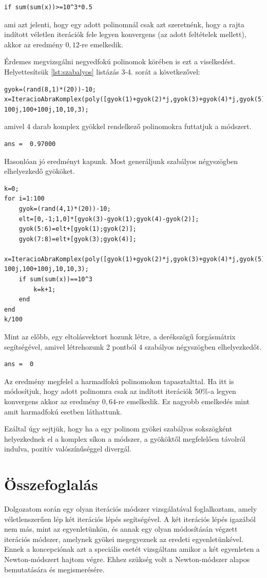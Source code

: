 \documentclass[a4paper,12pt]{report}
\newcommand{\todoor}[1]{\todo[color=orange!90, size=\footnotesize]{#1}}
\begin{document}
\begin{lstlisting}[firstnumber=6]
if sum(sum(x))>=10^3*0.5
\end{lstlisting}
ami azt jelenti, hogy egy adott polinomnál csak azt szeretnénk, hogy a rajta indított véletlen iterációk fele legyen konvergens (az adott feltételek mellett), akkor az eredmény $0,\!12$-re emelkedik.

Érdemes megvizsgálni negyedfokú polinomok körében is ezt a viselkedést. Helyettesítsük \ref{lst:szabalyos} listázás 3-4. sorát a következővel:
\begin{lstlisting}[firstnumber=3]
gyok=(rand(8,1)*(20))-10;
x=IteracioAbraKomplex(poly([gyok(1)+gyok(2)*j,gyok(3)+gyok(4)*j,gyok(5)+gyok(6)*j,gyok(7)+gyok(8)*j]),-100-100j,100+100j,10,10,3);
\end{lstlisting}
amivel 4 darab komplex gyökkel rendelkező polinomokra futtatjuk a módszert.
                \begin{lstlisting}[caption=Eredm\'eny]
ans =  0.97000
                \end{lstlisting}
Hasonlóan jó eredményt kapunk. Most generáljunk szabályos négyszögben elhelyezkedő gyököket.
\begin{lstlisting}[caption=Bemenet]
k=0;
for i=1:100
    gyok=(rand(4,1)*(20))-10;
    elt=[0,-1;1,0]*[gyok(3)-gyok(1);gyok(4)-gyok(2)];
    gyok(5:6)=elt+[gyok(1);gyok(2)];
    gyok(7:8)=elt+[gyok(3);gyok(4)];
    x=IteracioAbraKomplex(poly([gyok(1)+gyok(2)*j,gyok(3)+gyok(4)*j,gyok(5)+gyok(6)*j,gyok(7)+gyok(8)*j]),-100-100j,100+100j,10,10,3);
    if sum(sum(x))==10^3
        k=k+1;
    end
end
k/100
\end{lstlisting}
Mint az előbb, egy eltolásvektort hozunk létre, a derékszögű forgásmátrix segítségével, amivel létrehozunk 2 pontból 4 szabályos négyszögben elhelyezkedőt.
                \begin{lstlisting}[caption=Eredm\'eny]
ans =  0
                \end{lstlisting}
Az eredmény megfelel a harmadfokú polinomokon tapasztalttal. Ha itt is módosítjuk, hogy adott polinomra csak az indított iterációk 50\%-a legyen konvergens akkor az eredmény $0,\!64$-re emelkedik. Ez nagyobb emelkedés mint amit harmadfokú esetben láthattunk.

Ezáltal úgy sejtjük, hogy ha a egy polinom gyökei szabályos sokszögként helyezkednek el a komplex síkon a módszer, a gyököktől megfelelően távolról indulva, pozitív valószínűséggel divergál.

\chapter{Összefoglalás}
\todoor{2013.05.14: megírtam az összefoglalást}
Dolgozatom során egy olyan iterációs módszer vizsgálatával foglalkoztam, amely véletlenszerűen lép két iterációs lépés segítségével. A két iterációs lépés igazából nem más, mint az egyenletünkön, és annak egy olyan módosításán végzett iterációs módszer, amelynek gyökei megegyeznek az eredeti egyenletünkével. Ennek a koncepciónak azt a speciális esetét vizsgáltam amikor a két egyenleten a Newton-módszert hajtom végre. Ehhez szükség volt a Newton-módszer alapos bemutatására és megismerésére. 
\end{document}
